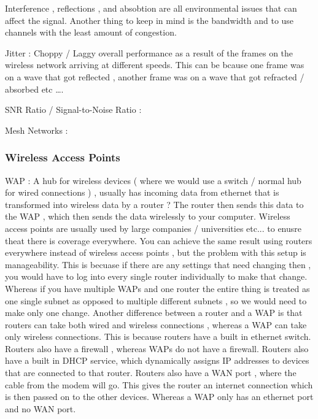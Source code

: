 Interference , reflections , and absobtion are all environmental issues that can
affect the signal. Another thing to keep in mind is the bandwidth and to use
channels with the least amount of congestion.

Jitter : Choppy / Laggy overall performance as a result of the frames on the wireless
network arriving at different speeds. This can be bcause one frame was on a wave
that got reflected , another frame was on a wave that got refracted / absorbed
etc \ldots.

SNR Ratio / Signal-to-Noise Ratio :

Mesh Networks :


\subsubsectionend

\subsubsection{Wireless Access Points}
\label{sssec:wireless_access_points}


WAP : A hub for wireless devices ( where we would use a switch / normal hub for
wired connections ) , usually has incoming data from ethernet that is
transformed into wireless data by a router ? The router then sends this data to
the WAP , which then sends the data wirelessly to your computer. Wireless access
points are usually used by large companies / universities etc... to enusre theat
there is coverage everywhere. You can achieve the same result using routers
everywhere instead of wireless access points , but the problem with this setup
is manageability. This is becuase if there are any settings that need changing
then , you would have to log into every single router individually to make that
change. Whereas if you have multiple WAPs and one router the entire thing is
treated as one single subnet as opposed to multiple different subnets , so we
would need to make only one change. Another difference between a router and a
WAP is that routers can take both wired and wireless connections , whereas a WAP
can take only wireless connections. This is because routers have a built in
ethernet switch. Routers also have a firewall , whereas WAPs do not have a
firewall. Routers also have a built in DHCP service, which dynamically assigns
IP addresses to devices that are connected to that router. Routers also have a
WAN port , where the cable from the modem will go. This gives the router an
internet connection which is then passed on to the other devices. Whereas a WAP
only has an ethernet port and no WAN port.

